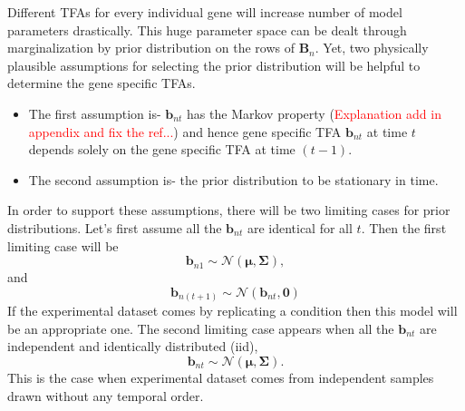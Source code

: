 Different TFAs for every individual gene will increase number of model parameters drastically. This huge parameter space can be dealt through marginalization by prior distribution on the rows of $\textbf{B}_n$. Yet, 
two physically plausible assumptions for selecting the prior distribution will be helpful to determine the gene specific TFAs. 
\begin{itemize}
 \item The first assumption is- $\textbf{b}_{nt}$ has the Markov property (\textcolor{red}{Explanation add in appendix and fix the ref...}) and hence gene specific TFA $\textbf{b}_{nt} $ at time $t$ depends solely on the gene specific TFA at time $(t-1)$.
 \item The second assumption is- the prior distribution to be stationary in time.
\end{itemize}

In order to support these assumptions, there will be two limiting cases for prior distributions. Let's first assume all the $\textbf{b}_{nt}$ are identical for all $t$. Then the first limiting case will be
\begin{equation} \label{eq:limit_one_a}
   \textbf{b}_{n1} \sim \mathcal{N} ( \boldsymbol{\mu},\boldsymbol{\Sigma}), 
\end{equation}
and
\begin{equation} \label{eq:limit_one_b}
   \textbf{b}_{n(t+1)} \sim \mathcal{N} ( \textbf{b}_{nt},\textbf{0})
\end{equation}
If the experimental dataset comes by replicating a condition then this model will be an appropriate one. The second limiting case appears when all the $\textbf{b}_{nt}$ are independent and identically distributed (iid),
\begin{equation} \label{eq:limit_two}
   \textbf{b}_{nt}\sim \mathcal{N} ( \boldsymbol{\mu},\boldsymbol{\Sigma}).
\end{equation}
This is the case when experimental dataset comes from independent samples drawn without any temporal order.

